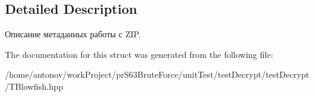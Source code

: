 \subsection{Detailed Description}
Описание метаданных работы с Z\+IP. 

The documentation for this struct was generated from the following file\+:\begin{DoxyCompactItemize}
\item 
/home/antonov/work\+Project/pr\+S63\+Brute\+Force/unit\+Test/test\+Decrypt/test\+Decrypt/T\+Blowfish.\+hpp\end{DoxyCompactItemize}

